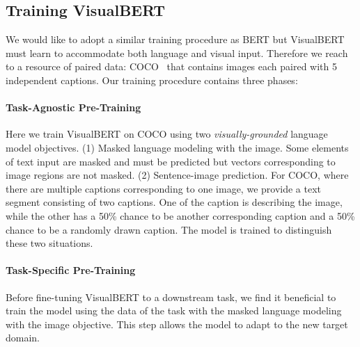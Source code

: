 \documentclass{article} \usepackage{iclr2019_conference,times}
\newcommand{\model}{VisualBERT\xspace}
\begin{document}
\subsection{Training \model}
\label{training_process}
\label{subsec:training}

We would like to adopt a similar training procedure as BERT but \model must learn to accommodate both language and visual input.
Therefore we reach to a resource of paired data: COCO~\citep{chen2015microsoft} that contains images each paired with 5 independent captions. Our training procedure contains three phases:

\vspace{-5pt}
\paragraph{Task-Agnostic Pre-Training}
Here we train VisualBERT on COCO using two \textit{visually-grounded} language model objectives. 
(1) Masked language modeling with the image. Some elements of text input are masked and must be predicted but vectors corresponding to image regions are not masked. 
(2) Sentence-image prediction. For COCO, where there are multiple captions corresponding to one image, we provide a text segment consisting of two captions. One of the caption is describing the image, while the other has a 50\% chance to be another corresponding caption and a 50\% chance to be a randomly drawn caption. The model is trained to distinguish these two situations.

\vspace{-5pt}
\paragraph{Task-Specific Pre-Training} Before fine-tuning \model to a downstream task, we find it beneficial to train the model using the data of the task with the masked language modeling with the image objective. This step allows the model to adapt to the new target domain.

\vspace{-5pt}
\end{document}

